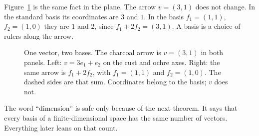 Figure~\ref{fig:bases} is the same fact in the plane. The arrow $v=(3,1)$ does not change. In the standard basis its coordinates are $3$ and $1$. In the basis $f_1=(1,1)$, $f_2=(1,0)$ they are $1$ and $2$, since $f_1+2f_2=(3,1)$. A basis is a choice of rulers along the arrow.

\begin{figure}[ht]
\centering
{}
\caption{One vector, two bases. The charcoal arrow is $v=(3,1)$ in both panels. Left: $v=3e_1+e_2$ on the rust and ochre axes. Right: the same arrow is $f_1+2f_2$, with $f_1=(1,1)$ and $f_2=(1,0)$. The dashed sides are that sum. Coordinates belong to the basis; $v$ does not.}
\label{fig:bases}
\end{figure}

The word ``dimension'' is safe only because of the next theorem. It says that every basis of a finite-dimensional space has the same number of vectors. Everything later leans on that count.

